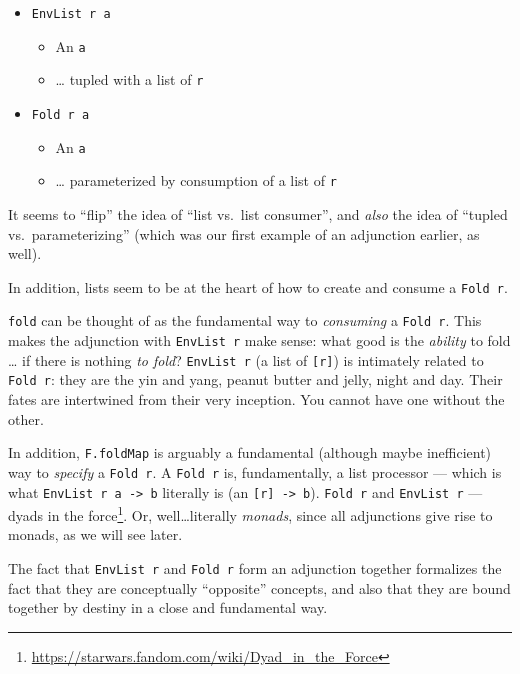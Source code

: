 \documentclass[]{article}
\renewcommand{\href}[2]{#2\footnote{\url{#1}}}
\begin{document}
\begin{itemize}
\tightlist
\item
  \texttt{EnvList\ r\ a}

  \begin{itemize}
  \tightlist
  \item
    An \texttt{a}
  \item
    \ldots{} tupled with a list of \texttt{r}
  \end{itemize}
\item
  \texttt{Fold\ r\ a}

  \begin{itemize}
  \tightlist
  \item
    An \texttt{a}
  \item
    \ldots{} parameterized by consumption of a list of \texttt{r}
  \end{itemize}
\end{itemize}

It seems to ``flip'' the idea of ``list vs.~list consumer'', and \emph{also} the
idea of ``tupled vs.~parameterizing'' (which was our first example of an
adjunction earlier, as well).

In addition, lists seem to be at the heart of how to create and consume a
\texttt{Fold\ r}.

\texttt{fold} can be thought of as the fundamental way to \emph{consuming} a
\texttt{Fold\ r}. This makes the adjunction with \texttt{EnvList\ r} make sense:
what good is the \emph{ability} to fold \ldots{} if there is nothing \emph{to
fold}? \texttt{EnvList\ r} (a list of \texttt{{[}r{]}}) is intimately related to
\texttt{Fold\ r}: they are the yin and yang, peanut butter and jelly, night and
day. Their fates are intertwined from their very inception. You cannot have one
without the other.

In addition, \texttt{F.foldMap} is arguably a fundamental (although maybe
inefficient) way to \emph{specify} a \texttt{Fold\ r}. A \texttt{Fold\ r} is,
fundamentally, a list processor --- which is what
\texttt{EnvList\ r\ a\ -\textgreater{}\ b} literally is (an
\texttt{{[}r{]}\ -\textgreater{}\ b}). \texttt{Fold\ r} and \texttt{EnvList\ r}
--- \href{https://starwars.fandom.com/wiki/Dyad_in_the_Force}{dyads in the
force}. Or, well\ldots literally \emph{monads}, since all adjunctions give rise
to monads, as we will see later.

The fact that \texttt{EnvList\ r} and \texttt{Fold\ r} form an adjunction
together formalizes the fact that they are conceptually ``opposite'' concepts,
and also that they are bound together by destiny in a close and fundamental way.
\end{document}
